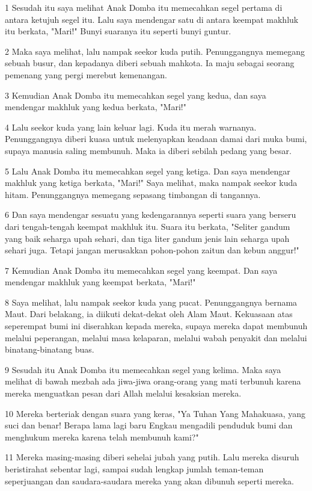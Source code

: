 \par 1 Sesudah itu saya melihat Anak Domba itu memecahkan segel pertama di antara ketujuh segel itu. Lalu saya mendengar satu di antara keempat makhluk itu berkata, "Mari!" Bunyi suaranya itu seperti bunyi guntur.
\par 2 Maka saya melihat, lalu nampak seekor kuda putih. Penunggangnya memegang sebuah busur, dan kepadanya diberi sebuah mahkota. Ia maju sebagai seorang pemenang yang pergi merebut kemenangan.
\par 3 Kemudian Anak Domba itu memecahkan segel yang kedua, dan saya mendengar makhluk yang kedua berkata, "Mari!"
\par 4 Lalu seekor kuda yang lain keluar lagi. Kuda itu merah warnanya. Penunggangnya diberi kuasa untuk melenyapkan keadaan damai dari muka bumi, supaya manusia saling membunuh. Maka ia diberi sebilah pedang yang besar.
\par 5 Lalu Anak Domba itu memecahkan segel yang ketiga. Dan saya mendengar makhluk yang ketiga berkata, "Mari!" Saya melihat, maka nampak seekor kuda hitam. Penunggangnya memegang sepasang timbangan di tangannya.
\par 6 Dan saya mendengar sesuatu yang kedengarannya seperti suara yang berseru dari tengah-tengah keempat makhluk itu. Suara itu berkata, "Seliter gandum yang baik seharga upah sehari, dan tiga liter gandum jenis lain seharga upah sehari juga. Tetapi jangan merusakkan pohon-pohon zaitun dan kebun anggur!"
\par 7 Kemudian Anak Domba itu memecahkan segel yang keempat. Dan saya mendengar makhluk yang keempat berkata, "Mari!"
\par 8 Saya melihat, lalu nampak seekor kuda yang pucat. Penunggangnya bernama Maut. Dari belakang, ia diikuti dekat-dekat oleh Alam Maut. Kekuasaan atas seperempat bumi ini diserahkan kepada mereka, supaya mereka dapat membunuh melalui peperangan, melalui masa kelaparan, melalui wabah penyakit dan melalui binatang-binatang buas.
\par 9 Sesudah itu Anak Domba itu memecahkan segel yang kelima. Maka saya melihat di bawah mezbah ada jiwa-jiwa orang-orang yang mati terbunuh karena mereka menguatkan pesan dari Allah melalui kesaksian mereka.
\par 10 Mereka berteriak dengan suara yang keras, "Ya Tuhan Yang Mahakuasa, yang suci dan benar! Berapa lama lagi baru Engkau mengadili penduduk bumi dan menghukum mereka karena telah membunuh kami?"
\par 11 Mereka masing-masing diberi sehelai jubah yang putih. Lalu mereka disuruh beristirahat sebentar lagi, sampai sudah lengkap jumlah teman-teman seperjuangan dan saudara-saudara mereka yang akan dibunuh seperti mereka.
